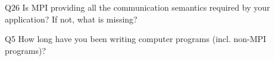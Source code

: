 \begin{description}%
\item{Q26} Is MPI providing all the communication semantics required by your application? If not, what is missing?%
\item{Q5} How long have you been writing computer programs (incl. non-MPI programs)?%
\end{description}%
